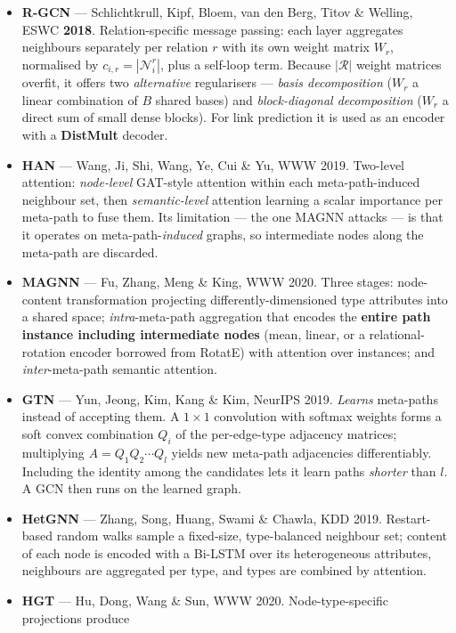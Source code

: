 \begin{itemize}\itemsep3pt
\item \textbf{R-GCN} --- Schlichtkrull, Kipf, Bloem, van den Berg, Titov \& Welling, ESWC
  \textbf{2018}. Relation-specific message passing: each layer aggregates neighbours separately per
  relation $r$ with its own weight matrix $W_r$, normalised by $c_{i,r}=|\mathcal{N}_i^r|$, plus a
  self-loop term. Because $|\mathcal{R}|$ weight matrices overfit, it offers two \emph{alternative}
  regularisers --- \emph{basis decomposition} ($W_r$ a linear combination of $B$ shared bases) and
  \emph{block-diagonal decomposition} ($W_r$ a direct sum of small dense blocks). For link
  prediction it is used as an encoder with a \textbf{DistMult} decoder.
\item \textbf{HAN} --- Wang, Ji, Shi, Wang, Ye, Cui \& Yu, WWW 2019. Two-level attention:
  \emph{node-level} GAT-style attention within each meta-path-induced neighbour set, then
  \emph{semantic-level} attention learning a scalar importance per meta-path to fuse them. Its
  limitation --- the one MAGNN attacks --- is that it operates on meta-path-\emph{induced} graphs,
  so intermediate nodes along the meta-path are discarded.
\item \textbf{MAGNN} --- Fu, Zhang, Meng \& King, WWW 2020. Three stages: node-content
  transformation projecting differently-dimensioned type attributes into a shared space;
  \emph{intra}-meta-path aggregation that encodes the \textbf{entire path instance including
  intermediate nodes} (mean, linear, or a relational-rotation encoder borrowed from RotatE) with
  attention over instances; and \emph{inter}-meta-path semantic attention.
\item \textbf{GTN} --- Yun, Jeong, Kim, Kang \& Kim, NeurIPS 2019. \emph{Learns} meta-paths instead
  of accepting them. A $1\times1$ convolution with softmax weights forms a soft convex combination
  $Q_i$ of the per-edge-type adjacency matrices; multiplying $A=Q_1Q_2\cdots Q_l$ yields new
  meta-path adjacencies differentiably. Including the identity among the candidates lets it learn
  paths \emph{shorter} than $l$. A GCN then runs on the learned graph.
\item \textbf{HetGNN} --- Zhang, Song, Huang, Swami \& Chawla, KDD 2019. Restart-based random walks
  sample a fixed-size, type-balanced neighbour set; content of each node is encoded with a
  Bi-LSTM over its heterogeneous attributes, neighbours are aggregated per type, and types are
  combined by attention.
\item \textbf{HGT} --- Hu, Dong, Wang \& Sun, WWW 2020. Node-type-specific projections produce

\end{itemize}
